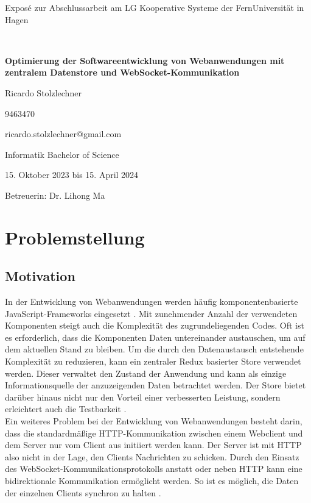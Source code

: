 \documentclass[12pt]{article} %
\begin{document}
\begin{center}
   \baselineskip
   
   Exposé zur Abschlussarbeit am LG Kooperative Systeme der FernUniversität in Hagen
   
   ~
   
   \LARGE\bfseries 
    Optimierung der Softwareentwicklung von Webanwendungen mit zentralem Datenstore und WebSocket-Kommunikation

   \large
   Ricardo Stolzlechner
   
   9463470
   
   ricardo.stolzlechner@gmail.com
   
   Informatik Bachelor of Science
   
   15. Oktober 2023 bis 15. April 2024
   
   Betreuerin: Dr. Lihong Ma
\end{center}

\section{Problemstellung}

\subsection{Motivation}
\label{motivation}

In der Entwicklung von Webanwendungen werden häufig komponentenbasierte JavaScript-Frameworks eingesetzt \cite{saks_javascript_2019}. 
Mit zunehmender Anzahl der verwendeten Komponenten steigt auch die Komplexität des zugrundeliegenden Codes. Oft ist es erforderlich, dass die Komponenten Daten untereinander austauschen, um auf dem aktuellen Stand zu bleiben. Um die durch den Datenaustausch entstehende Komplexität zu reduzieren, kann ein zentraler Redux basierter Store verwendet werden. Dieser verwaltet den Zustand der Anwendung und kann als einzige Informationsquelle der anzuzeigenden Daten betrachtet werden. Der Store bietet darüber hinaus nicht nur den Vorteil einer verbesserten Leistung, sondern erleichtert auch die Testbarkeit \cite{farhi_adding_2017}.
\\

Ein weiteres Problem bei der Entwicklung von Webanwendungen besteht darin, dass die standardmäßige HTTP-Kommunikation zwischen einem Webclient und dem Server nur vom Client aus initiiert werden kann. Der Server ist mit HTTP also nicht in der Lage, den Clients Nachrichten zu schicken. Durch den Einsatz des WebSocket-Kommunikationsprotokolls anstatt oder neben HTTP kann eine bidirektionale Kommunikation ermöglicht werden. So ist es möglich, die Daten der einzelnen Clients synchron zu halten \cite{furukawa_web-based_2011}.
\\
\end{document}
